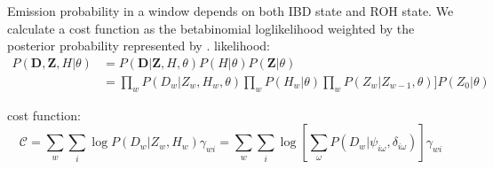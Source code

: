 \documentclass[12pt, letterpaper]{article}
\newcommand{\BZ}{\mathbf{Z}}
\begin{document}
Emission probability in a window depends on both IBD state and ROH state. We calculate a cost function as the betabinomial loglikelihood weighted by the posterior probability represented by \gamma.
likelihood:
\begin{align}
P(\mathbf{D},\BZ, H|\theta) &= P(\mathbf{D}|\mathbf{Z},H,\theta) P(H |\theta) P(\BZ|\theta)\nonumber\\
&= \prod_{w}  P(D_w|Z_w,  H_w, \theta) \prod_w P(H_w | \theta) \prod_{w} P(Z_w|Z_{w-1}, \theta)] P(Z_0| \theta) 
\end{align}

cost function:
\begin{equation}
    \mathcal{C} = 
       \sum_{w} \sum_{i} \log P(D_{w}|Z_w, H_w)\gamma_{wi}=
    \sum_{w} \sum_{i} 
    \log \left[\sum_{\omega}P(D_{w}|\psi_{i\omega},\delta_{i\omega}) \right] \gamma_{wi}
\end{equation}
\end{document}
